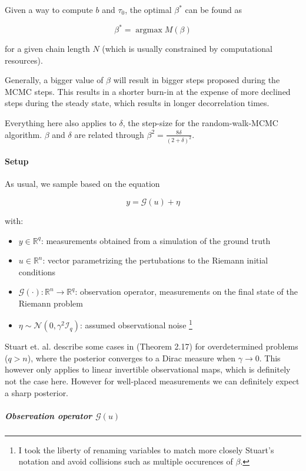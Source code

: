 \documentclass[11pt]{article}
\newcommand{\I}{{\mathcal{I}}}
\newcommand{\R}{{\mathbb{R}}}
\newcommand{\G}[1]{{\mathcal{G} \left( #1 \right)}}
\newcommand{\N}[2]{\mathcal{N}\left(#1,#2\right)}
\DeclareMathOperator*{\argmax}{argmax}
\begin{document}
Given a way to compute \(b\) and \(\tau_0\), the optimal \(\beta^*\) can be found as

$$\beta^* = \argmax M(\beta)$$

for a given chain length \(N\) (which is usually constrained by computational resources).

Generally, a bigger value of \(\beta\) will result in bigger steps proposed during the
MCMC steps. This results in a shorter burn-in at the expense of more declined steps during the
steady state, which results in longer decorrelation times.

Everything here also applies to \(\delta\), the step-size for the random-walk-MCMC algorithm.
\(\beta\) and \(\delta\) are related through \(\beta^2 = \frac{8 \delta}{(2 + \delta)^2}\).


\paragraph{Setup}
\label{sec:org7ef4fc0}

As usual, we sample based on the equation

$$y = \G{u} + \eta$$

with:
\begin{itemize}
\item \(y \in \R^q\): measurements obtained from a simulation of the ground truth
\item \(u \in \R^n\): vector parametrizing the pertubations to the Riemann initial conditions
\item \(\G{\cdot} :\R^n \to \R^q\): observation operator, measurements on the final state of the Riemann problem
\item \(\eta \sim \N{0}{\gamma^2 \I_q}\): assumed observational noise \footnote{I took the liberty of renaming variables to match more closely Stuart's notation
\cite{stuart_inverse_2010} and avoid collisions such as multiple occurences of \(\beta\).}
\end{itemize}

Stuart et. al. describe some cases in \cite{stuart_inverse_2010} (Theorem 2.17) for overdetermined 
problems (\(q > n\)), where the posterior converges to a Dirac measure when \(\gamma \to 0\).
This however only applies to linear invertible observational maps, which is definitely not the
case here. However for well-placed measurements we can definitely expect a sharp posterior.

\subparagraph{Observation operator \(\G{u}\)}
\label{sec:org2ba942c}
\end{document}
